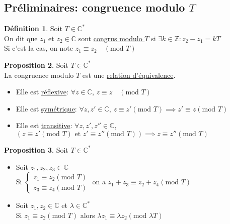 \documentclass[10pt,a4paper]{article}
\theoremstyle{definition}
\newtheorem{proposition}{Proposition}[section]
\newtheorem{definition}[proposition]{Définition}
\begin{document}
\subsection{Préliminaires: congruence modulo $T$}
\begin{definition}
Soit $T \in \mathbb{C}^*$ \\
On dit que $z_1$ et $z_2 \in \mathbb{C}$ sont \uline{congrus modulo $T$} si $\exists k \in \mathbb{Z}: z_2 - z_1 = kT$ \\
Si c'est la cas, on note $z_1 \equiv z_2 \quad (\text{mod }T)$
\end{definition}
\begin{proposition}
Soit $T \in \mathbb{C}^*$ \\
La congruence modulo $T$ est une \uline{relation d'équivalence}.
\begin{itemize}
\item Elle est \uline{réflexive}: $\forall z \in \mathbb{C}$, $z \equiv z \quad (\text{mod }T)$
\item Elle est \uline{symétrique}: $\forall z, z' \in \mathbb{C}$, $z \equiv z' (\text{mod }T) \implies z' \equiv z (\text{mod }T)$
\item Elle est \uline{transitive}: $\forall z, z', z'' \in \mathbb{C}$, $\left(z \equiv z' (\text{mod }T) \text{ et } z' \equiv z'' (\text{mod }T)\right) \implies z \equiv z'' (\text{mod }T)$
\end{itemize}
\end{proposition}
\begin{proposition}
Soit $T \in \mathbb{C}^*$
\begin{itemize}
\item Soit $z_1, z_2, z_3 \in \mathbb{C}$ \\
Si $\begin{cases}
z_1 \equiv z_2 (\text{mod }T) \\
z_3 \equiv z_4 (\text{mod }T)
\end{cases}$ on a $z_1 + z_3 \equiv z_2 + z_4 (\text{mod }T)$
\item Soit $z_1, z_2 \in \mathbb{C}$ et $\lambda \in \mathbb{C}^*$ \\
Si $z_1 \equiv z_2 (\text{mod }T)$ alors $\lambda z_1 \equiv \lambda z_2 (\text{mod }\lambda T)$
\end{itemize}
\end{proposition}
\end{document}
